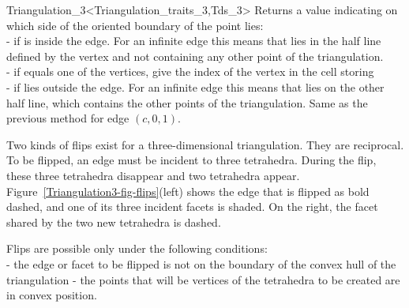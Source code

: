 \begin{ccRefClass}{Triangulation_3<Triangulation_traits_3,Tds_3>}
{Returns a value indicating on which side of the oriented boundary
of  the point  lies:\\
-  if  is inside the edge. For an
infinite edge this means that  lies in the half line defined by
the vertex and not containing any other point of the triangulation.\\ 
-  if  equals one of the vertices,
 give the index of the vertex in the cell storing \\
-  if  lies outside the edge. For
an infinite edge this means that  lies on the other half line,
which contains the other points of the triangulation.
}
\ccGlue
{}
{Same as the previous method for edge $(c,0,1)$.}


Two kinds of flips exist for a three-dimensional triangulation. They
are reciprocal. To be flipped, an edge must be incident to three
tetrahedra. During the flip, these three tetrahedra disappear and two
tetrahedra appear. Figure~\ref{Triangulation3-fig-flips}(left) shows the
edge that is flipped as bold dashed, and one of its three incident
facets is shaded. On the right, the facet shared by the two new
tetrahedra is dashed. 

Flips are possible only under the following conditions:\\
- the edge or facet to be flipped is not on the boundary of the convex
hull of the triangulation 
- the points that will be vertices of the tetrahedra to be created are 
in convex position.


\end{ccRefClass}
